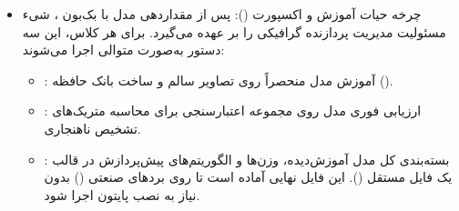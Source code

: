 \documentclass{article}
\begin{document}
\begin{itemize}
	\item چرخه حیات آموزش و اکسپورت (): پس از مقداردهی مدل  با بک‌بون ، شیء  مسئولیت مدیریت پردازنده گرافیکی را بر عهده می‌گیرد. برای هر کلاس، این سه دستور به‌صورت متوالی اجرا می‌شوند:
	\begin{itemize}
		\item {}: آموزش مدل منحصراً روی تصاویر سالم و ساخت بانک حافظه ().
		\item {}: ارزیابی فوری مدل روی مجموعه اعتبارسنجی برای محاسبه متریک‌های تشخیص ناهنجاری.
		\item {}: بسته‌بندی کل مدل آموزش‌دیده، وزن‌ها و الگوریتم‌های پیش‌پردازش در قالب یک فایل مستقل  (). این فایل نهایی آماده است تا روی بردهای صنعتی () بدون نیاز به نصب پایتون اجرا شود.
	\end{itemize}
\end{itemize}
\end{document}
